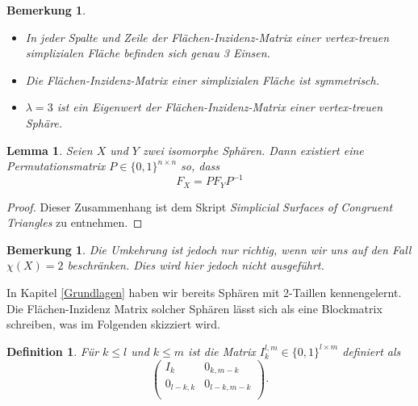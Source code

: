 \documentclass[12pt,titlepage,twoside,cleardoublepage]{article}
\theoremstyle{nummermitklammern}
\newtheorem{lemma}[temp]{Lemma}
\newtheorem{definition}[temp]{Definition}
\newtheorem{bemerkung}[temp]{Bemerkung}
\newtheorem{definition}[zahl]{Definition}
\newtheorem{lemma}[zahl]{Lemma}
\newtheorem{bemerkung}[zahl]{Bemerkung}
\numberwithin{equation}{section}
\begin{document}
\begin{bemerkung}
\begin{itemize}
\item In jeder Spalte und Zeile der Flächen-Inzidenz-Matrix einer vertex-treuen simplizialen Fläche befinden sich genau 3 Einsen. 
\item Die Flächen-Inzidenz-Matrix einer simplizialen Fläche  ist symmetrisch.
\item $\lambda =3$ ist ein Eigenwert der Flächen-Inzidenz-Matrix einer vertex-treuen Sphäre. 
\end{itemize}
\end{bemerkung}
\begin{lemma}
Seien $X$ und $Y$ zwei isomorphe Sphären. Dann existiert eine Permutationsmatrix $P\in \{0,1\}^{n \times n}$ so, dass 
\[
F_X=PF_YP^{-1}
\] 
\end{lemma}
\begin{proof}
Dieser Zusammenhang ist dem Skript \emph{Simplicial Surfaces of Congruent Triangles} zu entnehmen.
\end{proof}

\begin{bemerkung}
Die Umkehrung ist jedoch nur richtig, wenn wir uns auf den Fall $\chi(X)=2$ beschränken.  Dies wird hier jedoch nicht ausgeführt. 
\end{bemerkung}
In Kapitel \ref{Grundlagen} haben wir bereits Sphären mit 2-Taillen kennengelernt. Die Flächen-Inzidenz Matrix solcher Sphären lässt sich als eine Blockmatrix schreiben, was im Folgenden skizziert wird.
\begin{definition}
Für $k\leq l$ und $k\leq m$ ist die Matrix $I^{l,m}_k\in \{0,1\}^{l \times m}$ definiert als
\[
\left( 
\begin{array}{cccc} 
  I_k & 0_{k,m-k} \\
  0_{l-k,k} & 0_{l-k,m-k}\\
\end{array} 
\right).
\]
\end{definition}
\end{document}
